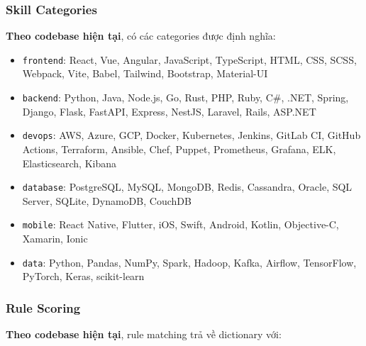\subsubsection{Skill Categories}

\textbf{Theo codebase hiện tại}, có các categories được định nghĩa:

\begin{itemize}
    \item \texttt{frontend}: React, Vue, Angular, JavaScript, TypeScript, HTML, CSS, SCSS, Webpack, Vite, Babel, Tailwind, Bootstrap, Material-UI
    \item \texttt{backend}: Python, Java, Node.js, Go, Rust, PHP, Ruby, C\#, .NET, Spring, Django, Flask, FastAPI, Express, NestJS, Laravel, Rails, ASP.NET
    \item \texttt{devops}: AWS, Azure, GCP, Docker, Kubernetes, Jenkins, GitLab CI, GitHub Actions, Terraform, Ansible, Chef, Puppet, Prometheus, Grafana, ELK, Elasticsearch, Kibana
    \item \texttt{database}: PostgreSQL, MySQL, MongoDB, Redis, Cassandra, Oracle, SQL Server, SQLite, DynamoDB, CouchDB
    \item \texttt{mobile}: React Native, Flutter, iOS, Swift, Android, Kotlin, Objective-C, Xamarin, Ionic
    \item \texttt{data}: Python, Pandas, NumPy, Spark, Hadoop, Kafka, Airflow, TensorFlow, PyTorch, Keras, scikit-learn
\end{itemize}

\subsubsection{Rule Scoring}

\textbf{Theo codebase hiện tại}, rule matching trả về dictionary với:

